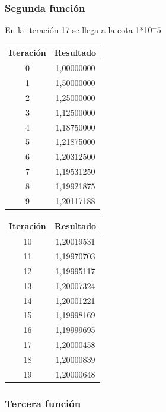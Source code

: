 \documentclass[titlepage,a4paper]{article}
\begin{document}
\subsubsection{Segunda función}\label{sec:bis2}

En la iteración 17 se llega a la cota 1*10$^-5$

\begin{multicols}{2}
\begin{center}
    \begin{tabular}{| c | c |}
    \hline
     Iteración & Resultado \\ \hline
        0     & 1,00000000 \\
        1     & 1,50000000 \\
        2     & 1,25000000 \\
        3     & 1,12500000 \\
        4     & 1,18750000 \\
        5     & 1,21875000 \\
        6     & 1,20312500 \\
        7     & 1,19531250 \\
        8     & 1,19921875 \\
        9     & 1,20117188 \\
           \hline
    \end{tabular}
\end{center}
        \begin{center}
    \begin{tabular}{| c | c |}
    \hline
     Iteración & Resultado \\ \hline
        10    & 1,20019531 \\
        11    & 1,19970703 \\
        12    & 1,19995117 \\
        13    & 1,20007324 \\
        14    & 1,20001221 \\
        15    & 1,19998169 \\
        16    & 1,19999695 \\
        17    & 1,20000458 \\
        18    & 1,20000839 \\
        19    & 1,20000648 \\
    \hline
    \end{tabular}
\end{center}
\end{multicols}
\subsubsection{Tercera función}\label{sec:bis3}
\end{document}
